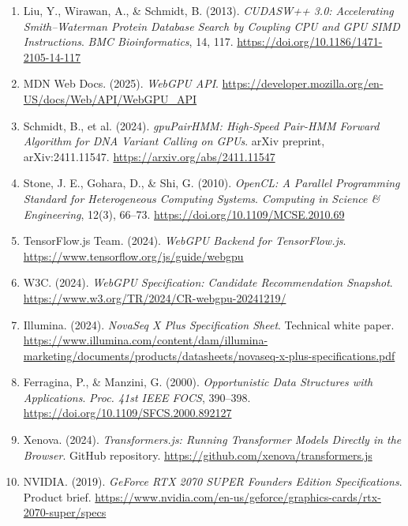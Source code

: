 \documentclass[PhD]{PHlab-thesis}
\begin{document}
\begin{enumerate}
  \item Liu, Y., Wirawan, A., \& Schmidt, B. (2013). \emph{CUDASW++ 3.0: Accelerating Smith–Waterman Protein Database Search by Coupling CPU and GPU SIMD Instructions}. \textit{BMC Bioinformatics}, 14, 117. \url{https://doi.org/10.1186/1471-2105-14-117}

  \item MDN Web Docs. (2025). \emph{WebGPU API}. \url{https://developer.mozilla.org/en-US/docs/Web/API/WebGPU_API}

  \item Schmidt, B., et al. (2024). \emph{gpuPairHMM: High-Speed Pair-HMM Forward Algorithm for DNA Variant Calling on GPUs}. arXiv preprint, arXiv:2411.11547. \url{https://arxiv.org/abs/2411.11547}

  \item Stone, J. E., Gohara, D., \& Shi, G. (2010). \emph{OpenCL: A Parallel Programming Standard for Heterogeneous Computing Systems}. \textit{Computing in Science \& Engineering}, 12(3), 66–73. \url{https://doi.org/10.1109/MCSE.2010.69}

  \item TensorFlow.js Team. (2024). \emph{WebGPU Backend for TensorFlow.js}. \url{https://www.tensorflow.org/js/guide/webgpu}

  \item W3C. (2024). \emph{WebGPU Specification: Candidate Recommendation Snapshot}. \url{https://www.w3.org/TR/2024/CR-webgpu-20241219/}

  \item Illumina. (2024). \emph{NovaSeq X Plus Specification Sheet}. Technical white paper. \url{https://www.illumina.com/content/dam/illumina-marketing/documents/products/datasheets/novaseq-x-plus-specifications.pdf}

  \item Ferragina, P., \& Manzini, G. (2000). \emph{Opportunistic Data Structures with Applications}. \textit{Proc. 41st IEEE FOCS}, 390–398. \url{https://doi.org/10.1109/SFCS.2000.892127}

  \item Xenova. (2024). \emph{Transformers.js: Running Transformer Models Directly in the Browser}. GitHub repository. \url{https://github.com/xenova/transformers.js}

  \item NVIDIA. (2019). \emph{GeForce RTX 2070 SUPER Founders Edition Specifications}. Product brief. \url{https://www.nvidia.com/en-us/geforce/graphics-cards/rtx-2070-super/specs}


\end{enumerate}
\end{document}
